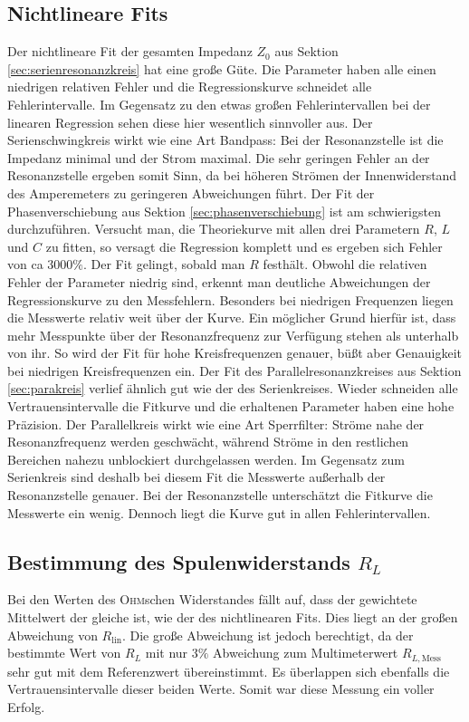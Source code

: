 \documentclass[12pt,a4paper,titlepage,headinclude]{scrartcl}
\numberwithin{equation}{subsection}
\newcommand{\mrm}[1]{\mathrm{#1}}
\newcommand{\person}[1]{\textsc{#1}}
\begin{document}
\subsection{Nichtlineare Fits}
Der nichtlineare Fit der gesamten Impedanz $Z_0$ aus Sektion \ref{sec:serienresonanzkreis} hat eine große Güte. Die Parameter haben alle einen niedrigen relativen Fehler und die Regressionskurve schneidet alle Fehlerintervalle. Im Gegensatz zu den etwas großen Fehlerintervallen bei der linearen Regression sehen diese hier wesentlich sinnvoller aus. Der Serienschwingkreis wirkt wie eine Art Bandpass: Bei der Resonanzstelle ist die Impedanz minimal und der Strom maximal. Die sehr geringen Fehler an der Resonanzstelle ergeben somit Sinn, da bei höheren Strömen der Innenwiderstand des Amperemeters zu geringeren Abweichungen führt. 
Der Fit der Phasenverschiebung aus Sektion \ref{sec:phasenverschiebung} ist am schwierigsten durchzuführen. Versucht man, die Theoriekurve mit allen drei Parametern $R$, $L$ und $C$ zu fitten, so versagt die Regression komplett und es ergeben sich Fehler von ca $3000\%$. Der Fit gelingt, sobald man $R$ festhält. Obwohl die relativen Fehler der Parameter niedrig sind, erkennt man deutliche Abweichungen der Regressionskurve zu den Messfehlern. Besonders bei niedrigen Frequenzen liegen die Messwerte relativ weit über der Kurve. Ein möglicher Grund hierfür ist, dass mehr Messpunkte über der Resonanzfrequenz zur Verfügung stehen als unterhalb von ihr. So wird der Fit für hohe Kreisfrequenzen genauer, büßt aber Genauigkeit bei niedrigen Kreisfrequenzen ein.
Der Fit des Parallelresonanzkreises aus Sektion \ref{sec:parakreis} verlief ähnlich gut wie der des Serienkreises. Wieder schneiden alle Vertrauensintervalle die Fitkurve und die erhaltenen Parameter haben eine hohe Präzision. Der Parallelkreis wirkt wie eine Art Sperrfilter: Ströme nahe der Resonanzfrequenz werden geschwächt, während Ströme in den restlichen Bereichen nahezu unblockiert durchgelassen werden. Im Gegensatz zum Serienkreis sind deshalb bei diesem Fit die Messwerte außerhalb der Resonanzstelle genauer. Bei der Resonanzstelle unterschätzt die Fitkurve die Messwerte ein wenig. Dennoch liegt die Kurve gut in allen Fehlerintervallen.
\subsection{Bestimmung des Spulenwiderstands $R_L$}
Bei den Werten des \person{Ohm}schen Widerstandes fällt auf, dass der gewichtete Mittelwert der gleiche ist, wie der des nichtlinearen Fits. Dies liegt an der großen Abweichung von $R_{\mrm{lin}}$. Die große Abweichung ist jedoch berechtigt, da der bestimmte Wert von $R_L$ mit nur $3\%$ Abweichung zum Multimeterwert $R_{L,\mrm{Mess}}$ sehr gut mit dem Referenzwert übereinstimmt. Es überlappen sich ebenfalls die Vertrauensintervalle dieser beiden Werte. Somit war diese Messung ein voller Erfolg.
\end{document}
